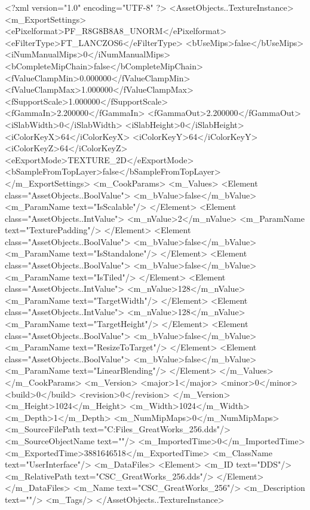 <?xml version="1.0" encoding="UTF-8" ?>
<AssetObjects..TextureInstance>
	<m_ExportSettings>
		<ePixelformat>PF_R8G8B8A8_UNORM</ePixelformat>
		<eFilterType>FT_LANCZOS6</eFilterType>
		<bUseMips>false</bUseMips>
		<iNumManualMips>0</iNumManualMips>
		<bCompleteMipChain>false</bCompleteMipChain>
		<fValueClampMin>0.000000</fValueClampMin>
		<fValueClampMax>1.000000</fValueClampMax>
		<fSupportScale>1.000000</fSupportScale>
		<fGammaIn>2.200000</fGammaIn>
		<fGammaOut>2.200000</fGammaOut>
		<iSlabWidth>0</iSlabWidth>
		<iSlabHeight>0</iSlabHeight>
		<iColorKeyX>64</iColorKeyX>
		<iColorKeyY>64</iColorKeyY>
		<iColorKeyZ>64</iColorKeyZ>
		<eExportMode>TEXTURE_2D</eExportMode>
		<bSampleFromTopLayer>false</bSampleFromTopLayer>
	</m_ExportSettings>
	<m_CookParams>
		<m_Values>
			<Element class="AssetObjects..BoolValue">
				<m_bValue>false</m_bValue>
				<m_ParamName text="IsScalable"/>
			</Element>
			<Element class="AssetObjects..IntValue">
				<m_nValue>2</m_nValue>
				<m_ParamName text="TexturePadding"/>
			</Element>
			<Element class="AssetObjects..BoolValue">
				<m_bValue>false</m_bValue>
				<m_ParamName text="IsStandalone"/>
			</Element>
			<Element class="AssetObjects..BoolValue">
				<m_bValue>false</m_bValue>
				<m_ParamName text="IsTiled"/>
			</Element>
			<Element class="AssetObjects..IntValue">
				<m_nValue>128</m_nValue>
				<m_ParamName text="TargetWidth"/>
			</Element>
			<Element class="AssetObjects..IntValue">
				<m_nValue>128</m_nValue>
				<m_ParamName text="TargetHeight"/>
			</Element>
			<Element class="AssetObjects..BoolValue">
				<m_bValue>false</m_bValue>
				<m_ParamName text="ResizeToTarget"/>
			</Element>
			<Element class="AssetObjects..BoolValue">
				<m_bValue>false</m_bValue>
				<m_ParamName text="LinearBlending"/>
			</Element>
		</m_Values>
	</m_CookParams>
	<m_Version>
		<major>1</major>
		<minor>0</minor>
		<build>0</build>
		<revision>0</revision>
	</m_Version>
	<m_Height>1024</m_Height>
	<m_Width>1024</m_Width>
	<m_Depth>1</m_Depth>
	<m_NumMipMaps>0</m_NumMipMaps>
	<m_SourceFilePath text="C:\Users\Shadow\Desktop\Working Files\Icons\GreatWorks\CSC_GreatWorks_256.dds"/>
	<m_SourceObjectName text=""/>
	<m_ImportedTime>0</m_ImportedTime>
	<m_ExportedTime>3881646518</m_ExportedTime>
	<m_ClassName text="UserInterface"/>
	<m_DataFiles>
		<Element>
			<m_ID text="DDS"/>
			<m_RelativePath text="CSC_GreatWorks_256.dds"/>
		</Element>
	</m_DataFiles>
	<m_Name text="CSC_GreatWorks_256"/>
	<m_Description text=""/>
	<m_Tags/>
</AssetObjects..TextureInstance>

